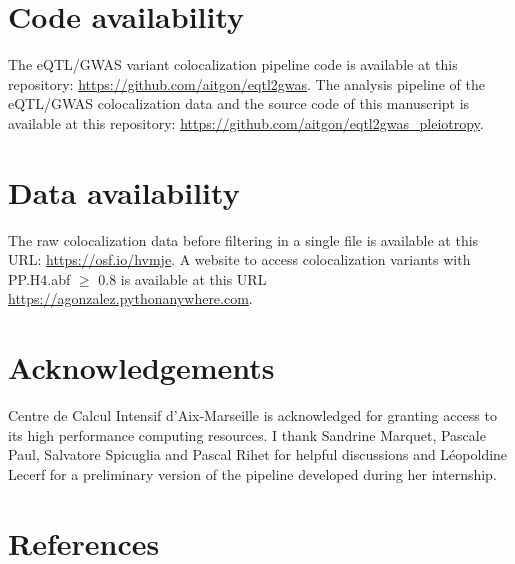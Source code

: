 \section*{Code availability}

The eQTL/GWAS variant colocalization pipeline code is available at this repository: \url{https://github.com/aitgon/eqtl2gwas}.
%
The analysis pipeline of the eQTL/GWAS colocalization data and the source code of this manuscript is available at this repository: \url{https://github.com/aitgon/eqtl2gwas_pleiotropy}.

\section*{Data availability}

The raw colocalization data before filtering in a single file is available at this URL: \url{https://osf.io/hvmje}.
%
A website to access colocalization variants with PP.H4.abf $\geq$ 0.8 is available at this URL \url{https://agonzalez.pythonanywhere.com}.

\section*{Acknowledgements}

Centre de Calcul Intensif d'Aix-Marseille is acknowledged for granting access to its high performance computing resources.
%
I thank Sandrine Marquet, Pascale Paul, Salvatore Spicuglia and Pascal Rihet for helpful discussions and L\'eopoldine Lecerf for a preliminary version of the pipeline developed during her internship.

\section*{References}




